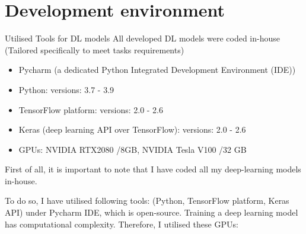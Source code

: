\documentclass[10pt,aspectratio=169,dvipsnames]{beamer} %
\begin{document}
	\section{Development environment}
	\setcounter{subfigure}{0}
	\begin{frame}{Utilised Tools for DL models}
		All developed DL models were \alert{coded in-house} \\
		\alert{(Tailored specifically to meet tasks requirements)} 
		\begin{itemize}	
			\item \alert{Pycharm} (a dedicated Python Integrated Development Environment (IDE))		
			\item \alert{Python}: versions: 3.7 - 3.9
			\item \alert{TensorFlow} platform: versions: 2.0 - 2.6
			\item \alert{Keras} (deep learning API over TensorFlow): versions: 2.0 - 2.6
			\item \alert{GPUs}: NVIDIA RTX2080 /8GB, NVIDIA Tesla V100 /32 GB
		\end{itemize}
	\end{frame}
	\note
	{
		First of all, it is important to note that I have coded all my deep-learning models in-house.
		
		
		To do so, I have utilised following tools:		
		(Python, TensorFlow platform, Keras API) under Pycharm IDE, which is open-source.
		Training a deep learning model has computational complexity.
		Therefore, I utilised these GPUs: 
	}
\end{document}
